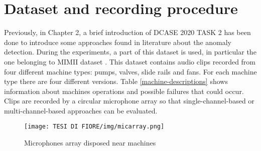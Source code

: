 \section{Dataset and recording procedure}
Previously, in Chapter 2, a brief introduction of DCASE 2020 TASK 2 has been done to introduce some approaches found in literature about the anomaly detection. During the experiments, a part of this dataset is used, in particular the one belonging to MIMII dataset \cite{20MIMIIDataset}.
This dataset contains audio clips recorded from four different machine types: pumps, valves, slide rails and fans. For each machine type there are four different versions. Table \ref{machine-descriptions} shows information about machines operations and possible failures that could occur. Clips are recorded by a circular microphone array so that single-channel-based or multi-channel-based approaches can be evaluated.
\begin{figure}[ht]
\texttt{[image: TESI DI FIORE/img/micarray.png]}
\centering
\caption{Microphones array disposed near machines \cite{DCASE}}
\label{micarray}
\end{figure}
